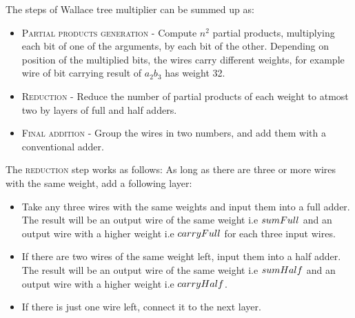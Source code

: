The steps of Wallace tree multiplier can be summed up as:

\begin{itemize}

\item \textsc{Partial products generation} - Compute $n^2$ partial products, multiplying each bit of one of the arguments, by each bit of the other. Depending on position of the multiplied bits, the wires carry different weights, for example wire of bit carrying result of $a_{2}b_{3}$ has weight 32.
\item \textsc{Reduction} - Reduce the number of partial products of each weight to atmost two by layers of full and half adders.
\item \textsc{Final addition} - Group the wires in two numbers, and add them with a conventional adder.

\end{itemize}

The \textsc{reduction} step works as follows: As long as there are three or more wires with the same weight, add a following layer:

\begin{itemize}

\item Take any three wires with the same weights and input them into a full adder. The result will be an output wire of the same weight i.e $sumFull$ and an output wire with a higher weight i.e $carryFull$ for each three input wires.
\item If there are two wires of the same weight left, input them into a half adder. The result will be an output wire of the same weight i.e $sumHalf$ and an output wire with a higher weight i.e $carryHalf$.
\item If there is just one wire left, connect it to the next layer.
\end{itemize}



